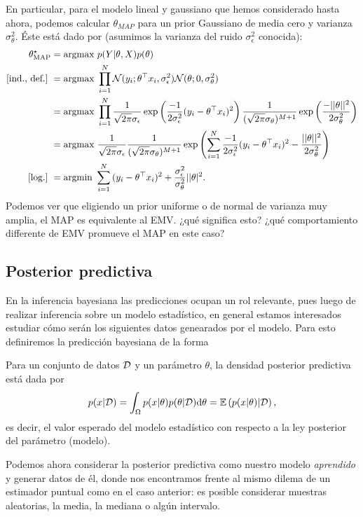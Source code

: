 \begin{example}
En particular, para el modelo lineal y gaussiano que hemos considerado hasta ahora, podemos calcular $\theta_{MAP}$ para un prior Gaussiano de media cero y varianza $\sigma_\theta^2$. Éste está dado por (asumimos la varianza del ruido $\sigma_\epsilon^2$ conocida):	
\begin{align}
	\theta_\text{MAP}^\star 	&= \text{argmax } p(Y|\theta,X)p(\theta)\nonumber\\
	\text{[ind., def.]}\ &= \text{argmax } \prod_{i=1}^N {\mathcal N}(y_i;\theta^\top x_i,\sigma_\epsilon^2){\mathcal N}(\theta;0,\sigma_\theta^2) \nonumber\\
	&= \text{argmax } \prod_{i=1}^N \frac{1}{\sqrt{2\pi}\sigma_\epsilon} \exp\left({\frac{-1}{2\sigma_\epsilon^2}(y_i-\theta^\top x_i)^2}\right)											\frac{1}{(\sqrt{2\pi}\sigma_\theta)^{M+1}} \exp\left({\frac{-||\theta||^2}{2\sigma_\theta^2}}\right) \nonumber\\
	 &= \text{argmax } \frac{1}{\sqrt{2\pi}\sigma_\epsilon} \frac{1}{(\sqrt{2\pi}\sigma_\theta)^{M+1}} \exp\left( \sum_{i=1}^N{\frac{-1}{2\sigma_\epsilon^2}(y_i-\theta^\top x_i)^2} -{\frac{||\theta||^2}{2\sigma_\theta^2}}\right) \nonumber\\
	\text{[log.]}\  &= \text{argmin } \sum_{i=1}^N{(y_i-\theta^\top x_i)^2} +{\frac{\sigma_\epsilon^2}{\sigma_\theta^2}||\theta |^2}.\nonumber 
	\label{eq:MAP_reg_lin}
\end{align}
Podemos ver que eligiendo un prior uniforme o de normal de varianza muy amplia, el MAP es equivalente al EMV. ¿qué significa esto? ¿qué comportamiento differente de EMV promueve el MAP en este caso?
\end{example}






\subsection{Posterior predictiva}

En la inferencia bayesiana las predicciones ocupan un rol relevante, pues luego de realizar inferencia sobre un modelo estadístico, en general estamos interesados estudiar cómo serán los siguientes datos genearados por el modelo. Para esto definiremos la predicción bayesiana de la forma

\begin{definition}
Para un conjunto de datos ${\mathcal D}$ y un parámetro $\theta$, la densidad posterior predictiva está dada por
\begin{equation}
    p(x|{\mathcal D}) = \int_\Omega p(x|\theta)p(\theta|{\mathcal D}){\text{d}}\theta = \mathbb{E} \left(p(x|\theta) |{\mathcal D}\right),
\end{equation}
es decir, el valor esperado del modelo estadístico con respecto a la ley posterior del parámetro (modelo).
\end{definition}
Podemos ahora considerar la posterior predictiva como nuestro modelo \emph{aprendido} y generar datos de él, donde nos encontramos frente al mismo dilema de un estimador puntual como en el caso anterior: es posible considerar muestras aleatorias, la media, la mediana o algún intervalo. 


